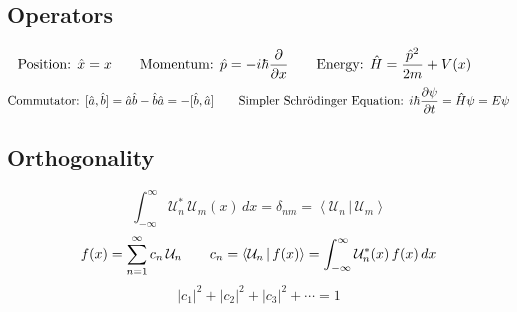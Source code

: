 \documentclass{article}
\begin{document}
\subsection*{Operators}
\[\textnormal{Position: }\hat{x}=x\hspace{7 mm}\textnormal{Momentum: }\hat{p}=-i\hbar\frac{\partial}{\partial x}\hspace{7 mm}\textnormal{Energy: }\hat{H}=\frac{\hat{p}^2}{2m}+V(x)\hspace{7 mm}\]
\[\textnormal{Commutator: }[\hat{a},\hat{b}]=\hat{a}\hat{b}-\hat{b}\hat{a}=-[\hat{b},\hat{a}]\hspace{7 mm}\textnormal{Simpler Schrödinger Equation: }i\hbar\frac{\partial\psi}{\partial t}=\hat{H}\psi=E\psi\]
\subsection*{Orthogonality}
\[\int_{-\infty}^\infty\mathcal{U}_n^{*}\,\mathcal{U}_m(x)\,dx=\delta_{nm}=\left<\mathcal{U}_n\,|\,\mathcal{U}_m\right>\]
\[f(x)=\sum_{n=1}^{\infty}c_n\,\mathcal{U}_n\hspace{7 mm}c_n=\left<\mathcal{U}_n\,|\,f(x)\right>=\int_{-\infty}^\infty\mathcal{U}_n^{*}(x)\,f(x)\,dx\]
\[|c_1|^2+|c_2|^2+|c_3|^2+\cdots=1\]
\end{document}
